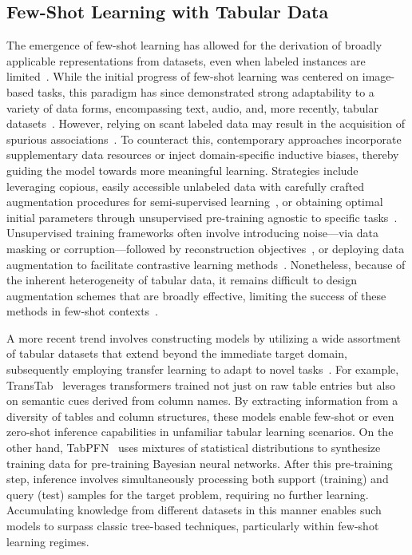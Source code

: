\subsection{Few-Shot Learning with Tabular Data} The emergence of few-shot learning has allowed for the derivation of broadly applicable representations from datasets, even when labeled instances are limited~\cite{chen2018closer}. While the initial progress of few-shot learning was centered on image-based tasks, this paradigm has since demonstrated strong adaptability to a variety of data forms, encompassing text, audio, and, more recently, tabular datasets~\cite{majumder2022few,nam2023stunt,schick2021exploiting}. However, relying on scant labeled data may result in the acquisition of spurious associations~\cite{bartlett2021deep}. To counteract this, contemporary approaches incorporate supplementary data resources or inject domain-specific inductive biases, thereby guiding the model towards more meaningful learning. Strategies include leveraging copious, easily accessible unlabeled data with carefully crafted augmentation procedures for semi-supervised learning~\cite{ucar2021subtab,yoon2020vime}, or obtaining optimal initial parameters through unsupervised pre-training agnostic to specific tasks~\cite{somepalli2021saint}. Unsupervised training frameworks often involve introducing noise—via data masking or corruption—followed by reconstruction objectives~\cite{arik2021tabnet,majmundar2022met}, or deploying data augmentation to facilitate contrastive learning methods~\cite{bahri2022scarf,chen2020simple}. Nonetheless, because of the inherent heterogeneity of tabular data, it remains difficult to design augmentation schemes that are broadly effective, limiting the success of these methods in few-shot contexts~\cite{nam2023stunt}.

A more recent trend involves constructing models by utilizing a wide assortment of tabular datasets that extend beyond the immediate target domain, subsequently employing transfer learning to adapt to novel tasks~\cite{zhang2023generative,levin2022transfer,zhu2023xtab}. For example, TransTab~\cite{wang2022transtab} leverages transformers trained not just on raw table entries but also on semantic cues derived from column names. By extracting information from a diversity of tables and column structures, these models enable few-shot or even zero-shot inference capabilities in unfamiliar tabular learning scenarios. On the other hand, TabPFN~\cite{hollmann2022tabpfn} uses mixtures of statistical distributions to synthesize training data for pre-training Bayesian neural networks. After this pre-training step, inference involves simultaneously processing both support (training) and query (test) samples for the target problem, requiring no further learning. Accumulating knowledge from different datasets in this manner enables such models to surpass classic tree-based techniques, particularly within few-shot learning regimes.

